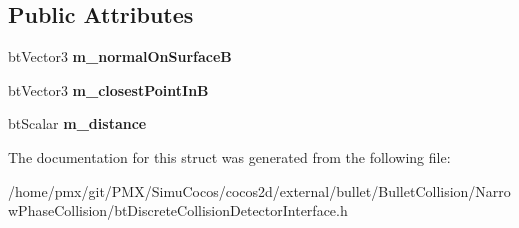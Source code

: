 \subsection*{Public Attributes}
\begin{DoxyCompactItemize}
\item 
\mbox{\label{structbtStorageResult_a8faa8494247b040e39588f5671b117ef}} 
bt\+Vector3 {\bfseries m\+\_\+normal\+On\+SurfaceB}
\item 
\mbox{\label{structbtStorageResult_a92e4f48a71800672aff7c07d06a43022}} 
bt\+Vector3 {\bfseries m\+\_\+closest\+Point\+InB}
\item 
\mbox{\label{structbtStorageResult_ad0c02fb0f5cffbd21b0857dab0b370fc}} 
bt\+Scalar {\bfseries m\+\_\+distance}
\end{DoxyCompactItemize}


The documentation for this struct was generated from the following file\+:\begin{DoxyCompactItemize}
\item 
/home/pmx/git/\+P\+M\+X/\+Simu\+Cocos/cocos2d/external/bullet/\+Bullet\+Collision/\+Narrow\+Phase\+Collision/bt\+Discrete\+Collision\+Detector\+Interface.\+h\end{DoxyCompactItemize}
